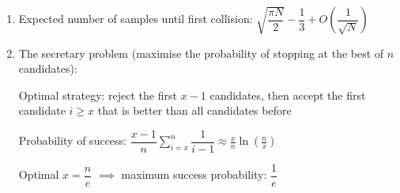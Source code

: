 \documentclass{article}
\begin{document}
\begin{enumerate}
	\item Expected number of samples until first collision: $\sqrt{\dfrac{\pi N}{2}}-\dfrac{1}{3}+O(\dfrac{1}{\sqrt{N}})$
	
%	
%	
	
	\item The secretary problem (maximise the probability of stopping at the best of $n$ candidates):
	
	Optimal strategy: reject the first $x-1$ candidates, then accept the first candidate $i\geq x$ that is better than all candidates before
	
	Probability of success: $\dfrac{x-1}{n}\displaystyle\sum_{i=x}^n\dfrac{1}{i-1}\approx\frac{x}{n}\ln\left(\frac{n}{x}\right)$
	
	Optimal $x=\dfrac{n}{e}$ $\implies$ maximum success probability: $\dfrac{1}{e}$
		
\end{enumerate}
\end{document}
